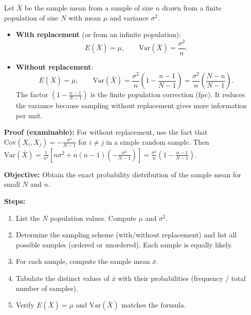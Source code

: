 \documentclass[11pt]{article}
\newcommand{\cle}[1]{{\popxbold\color{popdark}#1}}
\begin{document}
\begin{propriete}
Let $\bar{X}$ be the sample mean from a sample of size $n$ drawn from a finite population of size $N$ with mean $\mu$ and variance $\sigma^2$.
\begin{itemize}
\item \textbf{With replacement} (or from an infinite population): 
\[
E(\bar{X}) = \mu,\qquad \mathrm{Var}(\bar{X}) = \frac{\sigma^2}{n}.
\]
\item \textbf{Without replacement}: 
\[
E(\bar{X}) = \mu,\qquad \mathrm{Var}(\bar{X}) = \frac{\sigma^2}{n}\left(1-\frac{n-1}{N-1}\right) = \frac{\sigma^2}{n}\left(\frac{N-n}{N-1}\right).
\]
The factor $\left(1-\frac{n-1}{N-1}\right)$ is the \cle{finite population correction (fpc)}. It reduces the variance because sampling without replacement gives more information per unit.
\end{itemize}
\textbf{Proof (examinable):} For without replacement, use the fact that $\mathrm{Cov}(X_i,X_j) = -\frac{\sigma^2}{N-1}$ for $i\neq j$ in a simple random sample. Then $\mathrm{Var}(\bar{X}) = \frac{1}{n^2}\left[n\sigma^2 + n(n-1)\left(-\frac{\sigma^2}{N-1}\right)\right] = \frac{\sigma^2}{n}\left(1-\frac{n-1}{N-1}\right)$.
\end{propriete}

\begin{methode}
\textbf{Objective:} Obtain the exact probability distribution of the sample mean for small $N$ and $n$.

\textbf{Steps:}
\begin{enumerate}
\item List the $N$ population values. Compute $\mu$ and $\sigma^2$.
\item Determine the sampling scheme (with/without replacement) and list all possible samples (ordered or unordered). Each sample is equally likely.
\item For each sample, compute the sample mean $\bar{x}$.
\item Tabulate the distinct values of $\bar{x}$ with their probabilities (frequency / total number of samples).
\item Verify $E(\bar{X})=\mu$ and $\mathrm{Var}(\bar{X})$ matches the formula.
\end{enumerate}
\end{methode}
\end{document}
